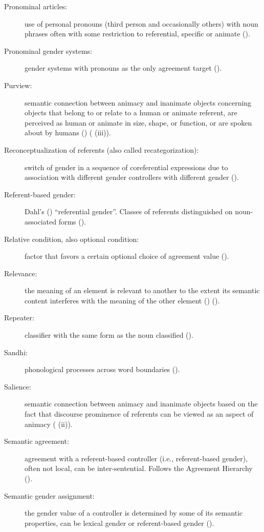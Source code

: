 \documentclass[output=collectionpaper]{langsci/langscibook}
\begin{document}
{\begin{description}
\item  [Pronominal articles:] use of personal pronouns (third person and occasionally others) with noun phrases often with some restriction to referential, specific or animate ().
\item  [Pronominal gender systems:] gender systems with pronouns as the only agreement target ().
\item  [Purview:] semantic connection between animacy and inanimate objects concerning objects that belong to or relate to a human or animate referent, are perceived as human or animate in size, shape, or function, or are spoken about by humans (\citealt{Gerdts2013}) ( (iii)).
%
\item  [Reconceptualization of referents (also called recategorization):] switch of gender in a sequence of coreferential expressions due to association with different gender controllers with different gender ().
\item  [Referent-based gender:] Dahl’s (\citeyear{Dahl2000a}) “referential gender”. Classes of referents distinguished on noun-associated forms ().
\item  [Relative condition, also optional condition:] factor that favors a certain optional choice of agreement value ().
\item  [Relevance:] the meaning of an element is relevant to another to the extent its semantic content interferes with the meaning of the other element (\citealt{Bybee1985a}) ().
\item  [Repeater:] classifier with the same form as the noun classified ().
\item  [Sandhi:] phonological processes across word boundaries ().
\item  [Salience:] semantic connection between animacy and inanimate objects based on the fact that discourse prominence of referents can be viewed as an aspect of animacy ( (ii)).
\item  [Semantic agreement:] agreement with a referent-based controller (i.e., referent-based gender), often not local, can be inter-sentential. Follows the Agreement Hierarchy ().
\item  [Semantic gender assignment:] the gender value of a controller is determined by some of its semantic properties, can be lexical gender or referent-based gender ().

\end{description}}
\end{document}
